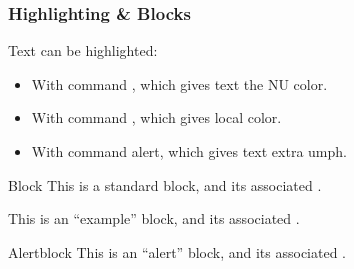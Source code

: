 \documentclass[9pt]{beamer}
\begin{document}
\begin{frame}
  \frametitle{Highlighting \& Blocks}

  Text can be highlighted:
  \begin{itemize}
    \item With command , which gives text the NU color.
    \item With command , which gives local color.
    \item With command \alert{alert}, which gives text extra umph.
  \end{itemize}

  \begin{block}{Block}
    This is a standard block, and its associated .
  \end{block}

  \begin{example}
    This is an ``example''  block, and its associated .
  \end{example}

  \begin{alertblock}{Alertblock}
    This is an ``alert''  block, and its associated .
  \end{alertblock}

\end{frame}

\hidelogo
\end{document}

